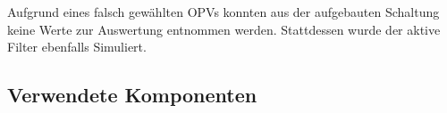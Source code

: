 \documentclass[a4paper]{hitec}
\begin{document}
Aufgrund eines falsch gewählten OPVs konnten aus der aufgebauten Schaltung keine Werte zur Auswertung entnommen werden. Stattdessen wurde der aktive Filter ebenfalls Simuliert.

\subsection{Verwendete Komponenten}

\medskip

\begin{devicelist}
\end{devicelist}

\vfill

\IncludeHistoryTimeline
\end{document}
